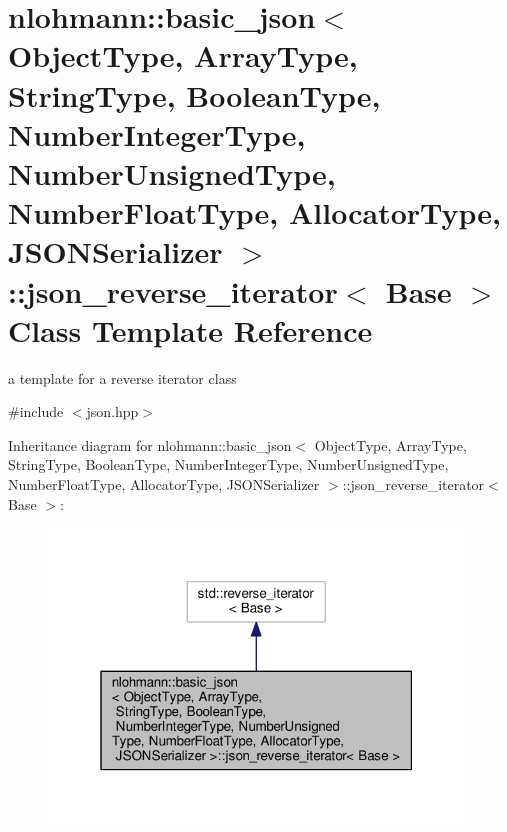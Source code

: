 \hypertarget{classnlohmann_1_1basic__json_1_1json__reverse__iterator}{}\section{nlohmann\+:\+:basic\+\_\+json$<$ Object\+Type, Array\+Type, String\+Type, Boolean\+Type, Number\+Integer\+Type, Number\+Unsigned\+Type, Number\+Float\+Type, Allocator\+Type, J\+S\+O\+N\+Serializer $>$\+:\+:json\+\_\+reverse\+\_\+iterator$<$ Base $>$ Class Template Reference}
\label{classnlohmann_1_1basic__json_1_1json__reverse__iterator}


a template for a reverse iterator class  




{\ttfamily \#include $<$json.\+hpp$>$}



Inheritance diagram for nlohmann\+:\+:basic\+\_\+json$<$ Object\+Type, Array\+Type, String\+Type, Boolean\+Type, Number\+Integer\+Type, Number\+Unsigned\+Type, Number\+Float\+Type, Allocator\+Type, J\+S\+O\+N\+Serializer $>$\+:\+:json\+\_\+reverse\+\_\+iterator$<$ Base $>$\+:
\nopagebreak
\begin{figure}[H]
\begin{center}
\leavevmode
\includegraphics[width=313pt]{classnlohmann_1_1basic__json_1_1json__reverse__iterator__inherit__graph}
\end{center}
\end{figure}


